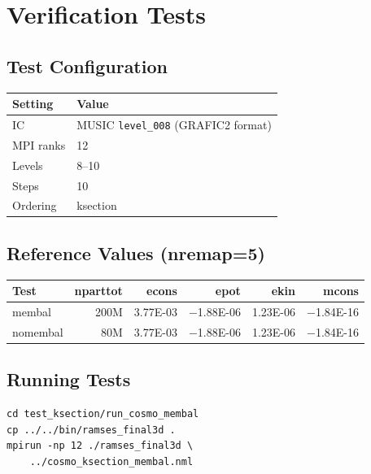 \documentclass[11pt,fleqn]{book}
\begin{document}
\chapter{Verification Tests}

\section{Test Configuration}

\begin{center}
\begin{tabular}{ll}
\toprule
\textbf{Setting} & \textbf{Value} \\
\midrule
IC & MUSIC \texttt{level\_008} (GRAFIC2 format) \\
MPI ranks & 12 \\
Levels & 8--10 \\
Steps & 10 \\
Ordering & ksection \\
\bottomrule
\end{tabular}
\end{center}

\section{Reference Values (nremap=5)}

\begin{center}
\begin{tabular}{lrrrrr}
\toprule
\textbf{Test} & \textbf{nparttot} & \textbf{econs} & \textbf{epot} & \textbf{ekin} & \textbf{mcons} \\
\midrule
membal & 200M & 3.77E-03 & $-$1.88E-06 & 1.23E-06 & $-$1.84E-16 \\
nomembal & 80M & 3.77E-03 & $-$1.88E-06 & 1.23E-06 & $-$1.84E-16 \\
\bottomrule
\end{tabular}
\end{center}

\section{Running Tests}

\begin{codebox}
\begin{lstlisting}[style=bash,numbers=none]
cd test_ksection/run_cosmo_membal
cp ../../bin/ramses_final3d .
mpirun -np 12 ./ramses_final3d \
    ../cosmo_ksection_membal.nml
\end{lstlisting}
\end{codebox}
\end{document}
